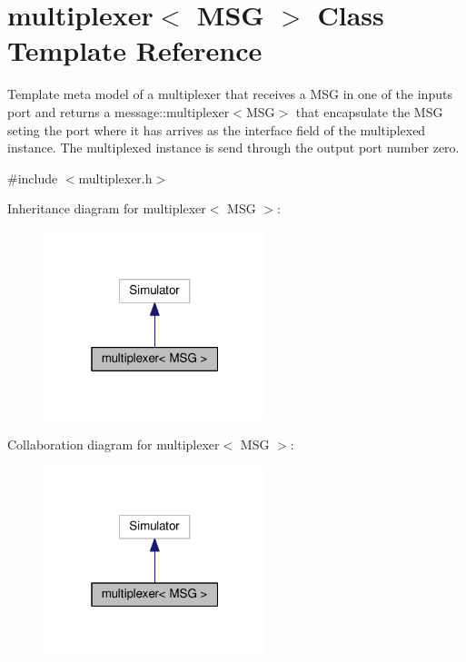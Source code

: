 \hypertarget{classmultiplexer}{}\section{multiplexer$<$ M\+SG $>$ Class Template Reference}
\label{classmultiplexer}


Template meta model of a multiplexer that receives a M\+SG in one of the inputs port and returns a message\+::multiplexer$<$\+M\+S\+G$>$ that encapsulate the M\+SG seting the port where it has arrives as the interface field of the multiplexed instance. The multiplexed instance is send through the output port number zero.  




{\ttfamily \#include $<$multiplexer.\+h$>$}



Inheritance diagram for multiplexer$<$ M\+SG $>$\+:\nopagebreak
\begin{figure}[H]
\begin{center}
\leavevmode
\includegraphics[width=184pt]{classmultiplexer__inherit__graph}
\end{center}
\end{figure}


Collaboration diagram for multiplexer$<$ M\+SG $>$\+:\nopagebreak
\begin{figure}[H]
\begin{center}
\leavevmode
\includegraphics[width=184pt]{classmultiplexer__coll__graph}
\end{center}
\end{figure}
